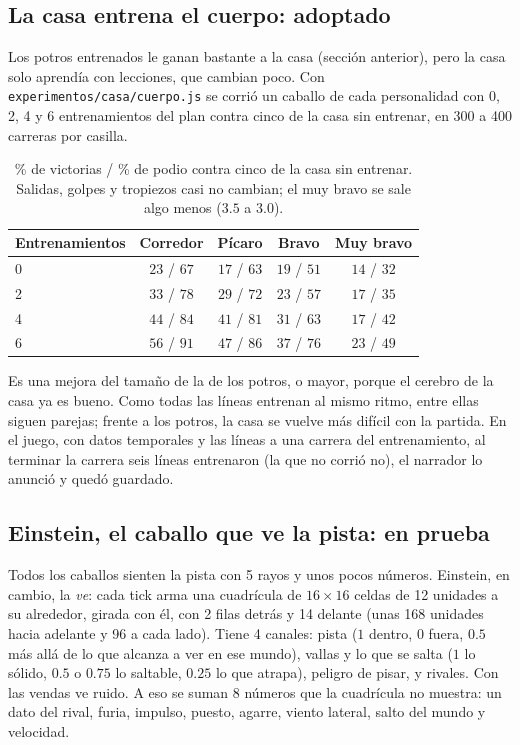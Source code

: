 \documentclass[11pt,letterpaper]{article}
\begin{document}
\subsection{La casa entrena el cuerpo: adoptado}
Los potros entrenados le ganan bastante a la casa (sección anterior), pero la casa solo aprendía con lecciones, que cambian poco. Con \texttt{experimentos/casa/cuerpo.js} se corrió un caballo de cada personalidad con 0, 2, 4 y 6 entrenamientos del plan contra cinco de la casa sin entrenar, en 300 a 400 carreras por casilla.
\begin{table}[h]\centering\footnotesize
\begin{tabular}{lcccc}
\toprule
Entrenamientos & Corredor & Pícaro & Bravo & Muy bravo \\
\midrule
0 & $23$ / $67$ & $17$ / $63$ & $19$ / $51$ & $14$ / $32$ \\
2 & $33$ / $78$ & $29$ / $72$ & $23$ / $57$ & $17$ / $35$ \\
4 & $44$ / $84$ & $41$ / $81$ & $31$ / $63$ & $17$ / $42$ \\
6 & $56$ / $91$ & $47$ / $86$ & $37$ / $76$ & $23$ / $49$ \\
\bottomrule
\end{tabular}
\caption{\% de victorias / \% de podio contra cinco de la casa sin entrenar. Salidas, golpes y tropiezos casi no cambian; el muy bravo se sale algo menos ($3.5$ a $3.0$).}
\end{table}
Es una mejora del tamaño de la de los potros, o mayor, porque el cerebro de la casa ya es bueno. Como todas las líneas entrenan al mismo ritmo, entre ellas siguen parejas; frente a los potros, la casa se vuelve más difícil con la partida. En el juego, con datos temporales y las líneas a una carrera del entrenamiento, al terminar la carrera seis líneas entrenaron (la que no corrió no), el narrador lo anunció y quedó guardado.

\subsection{Einstein, el caballo que ve la pista: en prueba}
Todos los caballos sienten la pista con 5 rayos y unos pocos números. Einstein, en cambio, la \emph{ve}: cada tick arma una cuadrícula de $16 \times 16$ celdas de 12 unidades a su alrededor, girada con él, con 2 filas detrás y 14 delante (unas 168 unidades hacia adelante y 96 a cada lado). Tiene 4 canales: pista ($1$ dentro, $0$ fuera, $0.5$ más allá de lo que alcanza a ver en ese mundo), vallas y lo que se salta ($1$ lo sólido, $0.5$ o $0.75$ lo saltable, $0.25$ lo que atrapa), peligro de pisar, y rivales. Con las vendas ve ruido. A eso se suman 8 números que la cuadrícula no muestra: un dato del rival, furia, impulso, puesto, agarre, viento lateral, salto del mundo y velocidad.
\end{document}
